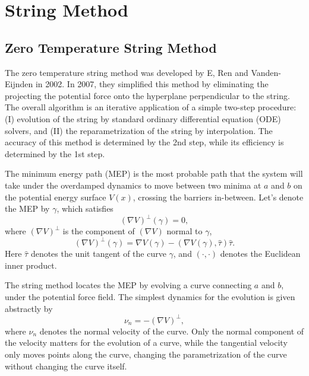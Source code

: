\section{String Method\label{Sec:ES:string}}
\subsection{Zero Temperature String Method\label{Sec:ES:string:ZTS}}
The zero temperature string method was developed by E, Ren and Vanden-Eijnden in 2002.\cite{EPRB2002} In 2007, they simplified this method by eliminating the projecting the potential force onto the hyperplane perpendicular to the string.\cite{EJCP2007} The overall algorithm is an iterative application of a simple two-step procedure: (I) evolution of the string by standard ordinary differential equation (ODE) solvers, and (II) the reparametrization of the string by interpolation. The accuracy of this method is determined by the 2nd step, while its efficiency is determined by the 1st step.

The minimum energy path (MEP) is the most probable path that the system will take under the overdamped dynamics to move between two minima at $a$ and $b$ on the potential energy surface $V(x)$, crossing the barriers in-between. Let's denote the MEP by $\gamma$, which satisfies 
\begin{equation}
    \left(\nabla V\right)^{\perp}(\gamma)=0,
\end{equation}
where $\left(\nabla V\right)^{\perp}$ is the component of $\left(\nabla V\right)$ normal to $\gamma$,
\begin{equation}
    \left(\nabla V\right)^{\perp}(\gamma)=\nabla V(\gamma)-\left(\nabla V(\gamma),\hat{\tau}\right)\hat{\tau}.
\end{equation}
Here $\hat{\tau}$ denotes the unit tangent of the curve $\gamma$, and $(\cdot,\cdot)$ denotes the Euclidean inner product. 

The string method locates the MEP by evolving a curve connecting $a$ and $b$, under the potential force field. The simplest dynamics for the evolution is given abstractly by
\begin{equation}
    \nu_n=-\left(\nabla V\right)^{\perp},
\end{equation}
where $\nu_n$ denotes the normal velocity of the curve. Only the normal component of the velocity matters for the evolution of a curve, while the tangential velocity only moves points along the curve, changing the parametrization of the curve without changing the curve itself. 

